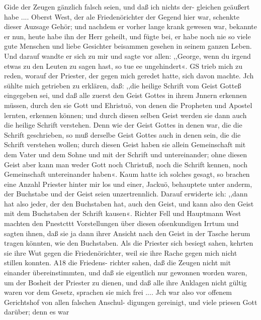 
Gide der Zeugen gänzlich falsch seien, und daß ich nichts der-
gleichen geäußert habe .... Oberst West, der ale Friedenörichter
der Gegend hier war, schenkte dieser Auzsage Gehör; und
nachdem er vorher lange krank gewesen war, bekannte er nun,
heute habe ihn der Herr geheilt, und fügte bei, er habe noch nie
so viele gute Menschen und liebe Gesichter beisammen gesehen in
seinem ganzen Leben. Und darauf wandte er sich zu mir und
sagte vor allen: ,,George, wenn du irgend etwas zu den Leuten
zu sagen hast, so tue ee ungehindert«. GS trieb mich zu reden,
worauf der Priester, der gegen mich geredet hatte, sich davon
machte. Jch sühlte mich getrieben zu erklären, daß: ,,die heilige
Schrift vom Geist Gotteß eingegeben sei, und daß alle zuerst
den Geist Gottes in ihrem Jnnern erkennen müssen, durch den
sie Gott und Ehristuö, von denen die Propheten und Apostel
lernten, erkennen können; und durch diesen selben Geist werden
sie dann auch die heilige Schrift verstehen. Denn wie der Geist
Gottes in denen war, die die Schrift geschrieben, so muß derselbe
Geist Gottes auch in denen sein, die die Schrift verstehen wollen;
durch diesen Geist haben sie allein Gemeinschaft mit dem Vater
und dem Sohne und mit der Schrift und untereinander; ohne
diesen Geist aber kann man weder Gott noch Christuß, noch die
Schrift kennen, noch Gemeinschaft untereinander haben«. Kaum
hatte ich solches gesagt, so brachen eine Anzahl Priester hinter
mir los und einer, Jackuö, behauptete unter anderm, der
Buchstabe und der Geist seien unzertrennlich. Darauf erwiderte
ich: ,,dann hat also jeder, der den Buchstaben hat, auch den
Geist, und kann also den Geist mit dem Buchstaben der Schrift
kausen«. Richter Fell und Hauptmann West machten den Pnestcttt
Vorstellungen über diesen ofsenkundigen Irrtum und sagten ihnen,
daß sie ja dann ihrer Ansicht nach den Geist in der Tasche herum
tragen könnten, wie den Buchstaben. Als die Priester sich besiegt
sahen, kehrten sie ihre Wut gegen die Friedenörichter, weil sie
ihre Rache gegen mich nicht stillen konnten. A18 die Friedens-
richter sahen, daß die Zeugen nicht mit einander übereinstimmten,
und daß sie eigentlich nur gewonnen worden waren, um der
Bosheit der Priester zu dienen, und daß alle ihre Anklagen nicht
gültig waren vor dem Gesetz, sprachen sie mich frei .... Jch
war also vor offenem Gerichtshof von allen falschen Anschul-
digungen gereinigt, und viele priesen Gott darüber; denn es war



